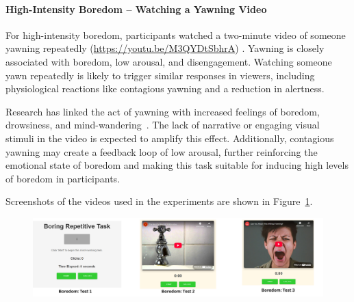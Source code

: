 \paragraph*{High-Intensity Boredom – Watching a Yawning Video}

For high-intensity boredom, participants watched a two-minute video of someone yawning repeatedly (\url{https://youtu.be/M3QYDtSbhrA}) \cite{buzzfeed_yawning_video}. Yawning is closely associated with boredom, low arousal, and disengagement. Watching someone yawn repeatedly is likely to trigger similar responses in viewers, including physiological reactions like contagious yawning and a reduction in alertness.

Research has linked the act of yawning with increased feelings of boredom, drowsiness, and mind-wandering~\citep{norscia2020auditory}. The lack of narrative or engaging visual stimuli in the video is expected to amplify this effect. Additionally, contagious yawning may create a feedback loop of low arousal, further reinforcing the emotional state of boredom and making this task suitable for inducing high levels of boredom in participants.

Screenshots of the videos used in the experiments are shown in Figure~\ref{fig:task-boredom}. 

\begin{figure}[h]
    \centering
    \includegraphics[width=1\textwidth]{img/chapter_03/boredom_tests.png}
    \label{fig:task-boredom}
\end{figure}